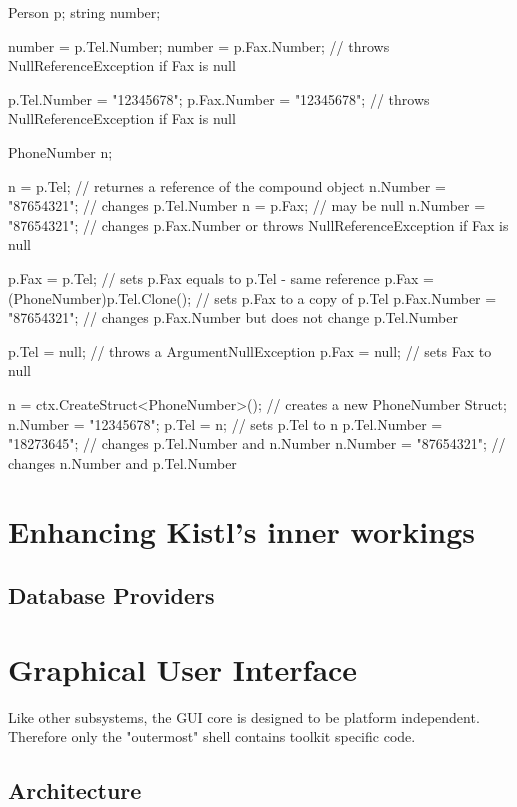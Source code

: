\begin{CS}
Person p;
string number;

number = p.Tel.Number;
number = p.Fax.Number; // throws NullReferenceException if Fax is null

p.Tel.Number = "12345678";
p.Fax.Number = "12345678"; // throws NullReferenceException if Fax is null

PhoneNumber n;

n = p.Tel; // returnes a reference of the compound object
n.Number = "87654321"; // changes p.Tel.Number
n = p.Fax; // may be null
n.Number = "87654321"; // changes p.Fax.Number or throws NullReferenceException if Fax is null

p.Fax = p.Tel; // sets p.Fax equals to p.Tel - same reference
p.Fax = (PhoneNumber)p.Tel.Clone(); // sets p.Fax to a copy of p.Tel
p.Fax.Number = "87654321"; // changes p.Fax.Number but does not change p.Tel.Number

p.Tel = null; // throws a ArgumentNullException
p.Fax = null; // sets Fax to null

n = ctx.CreateStruct<PhoneNumber>(); // creates a new PhoneNumber Struct;
n.Number = "12345678";
p.Tel = n; // sets p.Tel to n
p.Tel.Number = "18273645"; // changes p.Tel.Number and n.Number
n.Number = "87654321"; // changes n.Number and p.Tel.Number
\end{CS}

\section{Enhancing Kistl's inner workings}

\subsection{Database Providers}

\section{Graphical User Interface}

Like other subsystems, the GUI core is designed to be platform
independent. Therefore only the "outermost" shell contains toolkit
specific code.

\subsection{Architecture}

